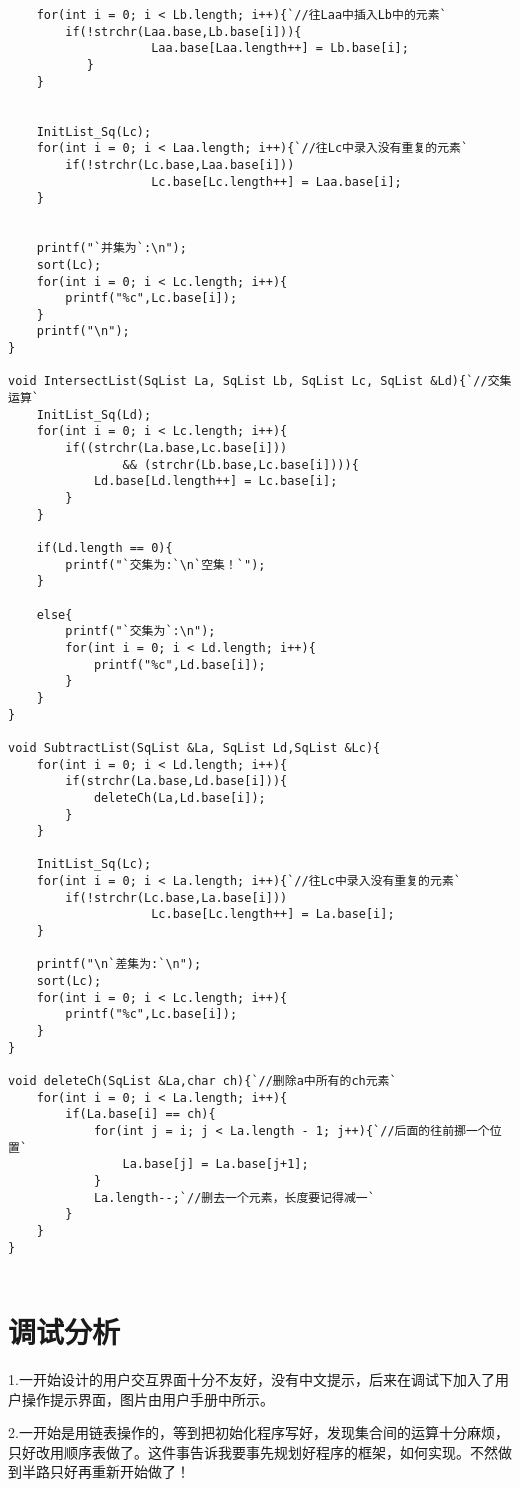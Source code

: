 \documentclass[11pt,letterpaper]{ctexart}
\begin{document}
{\begin{lstlisting}
	for(int i = 0; i < Lb.length; i++){`//往Laa中插入Lb中的元素`
		if(!strchr(Laa.base,Lb.base[i])){
                    Laa.base[Laa.length++] = Lb.base[i];
           }
	}
	
	
	InitList_Sq(Lc);
	for(int i = 0; i < Laa.length; i++){`//往Lc中录入没有重复的元素`
		if(!strchr(Lc.base,Laa.base[i]))
                    Lc.base[Lc.length++] = Laa.base[i];
	}
	
	
	printf("`并集为`:\n");
	sort(Lc);
	for(int i = 0; i < Lc.length; i++){
		printf("%c",Lc.base[i]);
	}	
	printf("\n");
}

void IntersectList(SqList La, SqList Lb, SqList Lc, SqList &Ld){`//交集运算`
	InitList_Sq(Ld);
	for(int i = 0; i < Lc.length; i++){
		if((strchr(La.base,Lc.base[i]))
                && (strchr(Lb.base,Lc.base[i]))){
			Ld.base[Ld.length++] = Lc.base[i];
		}
	}
	
	if(Ld.length == 0){
		printf("`交集为:`\n`空集！`");
	}
	
	else{
		printf("`交集为`:\n");
		for(int i = 0; i < Ld.length; i++){
			printf("%c",Ld.base[i]);
		}
	}
}

void SubtractList(SqList &La, SqList Ld,SqList &Lc){
	for(int i = 0; i < Ld.length; i++){
		if(strchr(La.base,Ld.base[i])){
			deleteCh(La,Ld.base[i]);
		}
	}	
	
	InitList_Sq(Lc);
	for(int i = 0; i < La.length; i++){`//往Lc中录入没有重复的元素`
		if(!strchr(Lc.base,La.base[i]))
                    Lc.base[Lc.length++] = La.base[i];
	}
	
	printf("\n`差集为:`\n");
	sort(Lc);
	for(int i = 0; i < Lc.length; i++){
		printf("%c",Lc.base[i]);
	}
}

void deleteCh(SqList &La,char ch){`//删除a中所有的ch元素`
	for(int i = 0; i < La.length; i++){
		if(La.base[i] == ch){
			for(int j = i; j < La.length - 1; j++){`//后面的往前挪一个位置`
				La.base[j] = La.base[j+1];
			}
			La.length--;`//删去一个元素，长度要记得减一`
		}
	}
}


\end{lstlisting}
    \section{调试分析}
    1.一开始设计的用户交互界面十分不友好，没有中文提示，后来在调试下加入了用户操作提示界面，图片由用户手册中所示。

    2.一开始是用链表操作的，等到把初始化程序写好，发现集合间的运算十分麻烦，只好改用顺序表做了。这件事告诉我要事先规划好程序的框架，如何实现。不然做到半路只好再重新开始做了！
    
}
\end{document}
